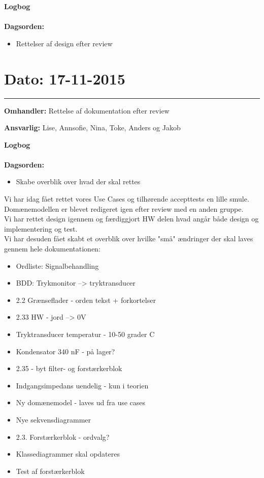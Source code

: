 \textbf{Logbog}
\\
\\
\textbf{Dagsorden:}
\begin{itemize}
	\item Rettelser af design efter review
\end{itemize}




\section{Dato: 17-11-2015 }
\hrule

\textbf{Omhandler:} Rettelse af dokumentation efter review 

\textbf{Ansvarlig:} Lise, Annsofie, Nina, Toke, Anders og Jakob

\textbf{Logbog}
\\
\\
\textbf{Dagsorden:}
\begin{itemize}
	\item Skabe overblik over hvad der skal rettes
\end{itemize}

Vi har idag fået rettet vores Use Cases og tilhørende accepttests en lille smule.\\
Domænemodellen er blevet redigeret igen efter review med en anden gruppe.\\
Vi har rettet design igennem og færdiggjort HW delen hvad angår både design og implementering og test.\\
Vi har desuden fået skabt et overblik over hvilke "små" ændringer der skal laves gennem hele dokumentationen:
\begin{itemize}
	\item Ordliste: Signalbehandling
	\item BDD: Trykmonitor --> tryktransducer
	\item 2.2 Grænseflader - orden tekst + forkortelser
	\item 2.33 HW - jord --> 0V
	\item Tryktransducer temperatur - 10-50 grader C
	\item Kondensator 340 nF - på lager? 
	\item 2.35 - byt filter- og forstærkerblok
	\item Indgangsimpedans uendelig - kun i teorien
	\item Ny domænemodel - laves ud fra use cases
	\item Nye sekvensdiagrammer
	\item 2.3. Forstærkerblok - ordvalg?
	\item Klassediagrammer skal opdateres
	\item Test af forstærkerblok
\end{itemize} 




